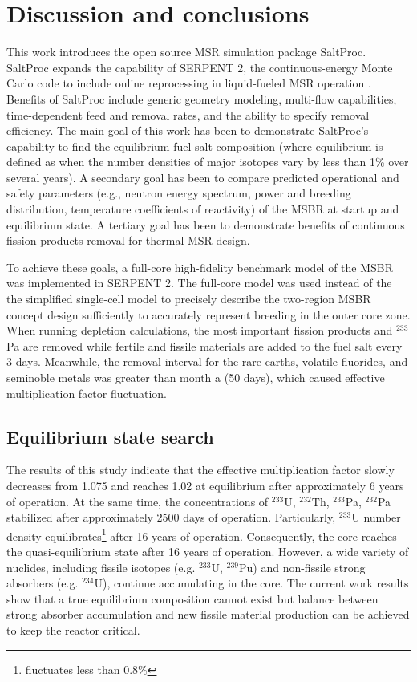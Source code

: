 \section{Discussion and conclusions}

This work introduces the open source \gls{MSR} simulation package SaltProc. 
SaltProc expands the capability of SERPENT 2, the continuous-energy Monte Carlo 
code to include online reprocessing in liquid-fueled \gls{MSR} operation 
\cite{rykhlevskii_arfc/saltproc:_2018}. Benefits of SaltProc include 
generic geometry modeling, multi-flow capabilities, time-dependent feed and 
removal rates, and the ability to specify removal efficiency. The main goal of 
this work has 
been to demonstrate SaltProc's capability to find the equilibrium fuel salt 
composition (where equilibrium is defined as when the number densities of major 
isotopes vary by less than 1\% over several years). A secondary goal has been to 
compare predicted operational and safety parameters (e.g., neutron energy 
spectrum, power and breeding distribution, temperature coefficients of 
reactivity) of the \gls{MSBR} at startup and equilibrium state. A tertiary goal 
has been to demonstrate benefits of continuous fission products removal for 
thermal \gls{MSR} design.

To achieve these goals, a full-core high-fidelity benchmark model of the \gls{MSBR} 
was implemented in SERPENT 2. The full-core model was used instead of the 
the simplified single-cell model \cite{betzler_molten_2017, 
rykhlevskii_online_2017, betzler_fuel_2018} to precisely describe the 
two-region \gls{MSBR} concept design sufficiently to accurately represent 
breeding in the outer core zone. When running depletion calculations, the most 
important fission products and $^{233}$Pa are removed while fertile and fissile 
materials are added to the fuel salt every 3 days.  Meanwhile, the removal 
interval for the rare earths, volatile fluorides, and seminoble metals was greater 
than month a (50 days), which caused effective multiplication factor fluctuation. 

\subsection{Equilibrium state search}
The results of this study indicate that the effective multiplication factor 
slowly decreases from 1.075 and reaches 1.02 at equilibrium after approximately 
6 years of operation. At the same time, the concentrations of $^{233}$U, $^{232}$Th, 
$^{233}$Pa, $^{232}$Pa stabilized after approximately 2500 days of operation. 
Particularly, $^{233}$U number density equilibrates\footnote{fluctuates less 
than 0.8\%} after 16 years of operation. Consequently, the core reaches the quasi-equilibrium state 
after 16 years of operation. However, a wide variety of nuclides, 
including fissile isotopes (e.g. $^{233}$U, $^{239}$Pu) and non-fissile strong 
absorbers (e.g. $^{234}$U), continue accumulating in the core. The current work results 
show that a true equilibrium composition cannot exist but balance
between strong absorber accumulation and new fissile material 
production can be achieved to keep the reactor critical.

